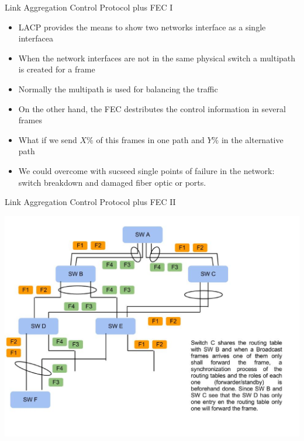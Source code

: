 \documentclass[compress,red]{beamer}
\begin{document}
\begin{frame}{Link Aggregation Control Protocol plus FEC I}

\begin{itemize}
    \item LACP provides the means to show two networks interface as a single  interfacea
    \item When the network interfaces are not in the same physical switch a  multipath is created for a frame
    \item Normally the multipath is used for balancing the traffic
    \item On the other hand, the FEC destributes the control information in several frames
    \item What if we send $X\%$ of this frames in one path and $Y\%$ in the alternative path
    \item We could overcome with sucseed single points of failure in the network: switch breakdown and damaged fiber optic or ports.
\end{itemize}
\end{frame}

\begin{frame}{Link Aggregation Control Protocol plus FEC II}

      \begin{center}
	        \includegraphics[scale=0.30]{robustness/WR_LA_3.png}
      \end{center}
\end{frame}
\end{document}
